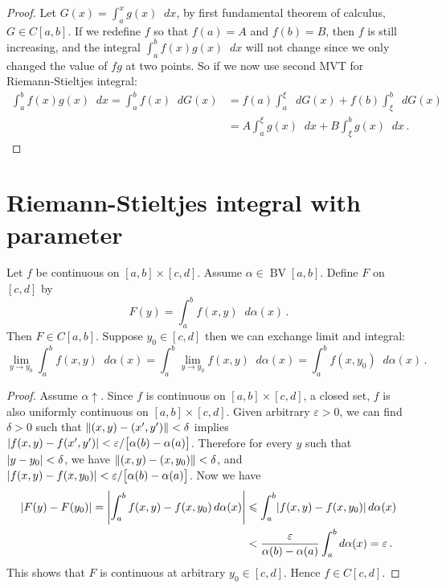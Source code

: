 \documentclass{article}
\DeclarePairedDelimiter\abs{\lvert}{\rvert}
\DeclarePairedDelimiter\norm{\lVert}{\rVert}
\newcommand{\dd}{\mathop{}\!d}
\newcommand{\increasing}{\uparrow}
\DeclareMathOperator{\BV}{BV}
\begin{document}
\begin{proof}
    Let $ G(x) = \int_a^x g(x) \dd x $, by first fundamental theorem of calculus, $ G \in C[a, b] $. If we redefine $ f $ so that $ f(a) = A $ and $ f(b) = B $, then $ f $ is still increasing, and the integral $ \int_a^b f(x) g(x) \dd x $ will not change since we only changed the value of $ f g $ at two points. So if we now use second MVT for Riemann-Stieltjes integral:
    \begin{align*}
        \int_a^b f(x) g(x) \dd x = \int_a^b f(x) \dd G(x) &= f(a) \int_a^\xi \dd G(x) + f(b) \int_\xi^b \dd G(x) \\
        &= A \int_a^\xi g(x) \dd x + B \int_\xi^b g(x) \dd x \,.
    \end{align*}
\end{proof}

\section{Riemann-Stieltjes integral with parameter}
\begin{theorem}
    Let $ f $ be continuous on $ [a, b] \times [c, d] $. Assume $ \alpha \in \BV[a, b] $. Define $ F $ on $ [c, d] $ by
    \[ 
        F(y) = \int_a^b f(x, y) \dd \alpha(x) \,.
    \]
    Then $ F \in C[a, b] $. Suppose $ y_0 \in [c, d] $ then we can exchange limit and integral:
    \[ 
        \lim_{y \to y_0} \int_a^b f(x, y) \dd \alpha(x) = \int_a^b \lim_{y \to y_0} f(x, y) \dd \alpha(x) = \int_a^b f(x, y_0) \dd \alpha(x) \,.
    \]
\end{theorem}

\begin{proof}
    Assume $ \alpha \increasing $. Since $ f $ is continuous on $ [a, b] \times [c, d] $, a closed set, $ f $ is also uniformly continuous on $ [a, b] \times [c, d] $. Given arbitrary $ \varepsilon > 0 $, we can find $ \delta > 0 $ such that $ \norm{(x, y) - (x', y')} < \delta $ implies $ \abs{ f(x, y) - f(x', y') } < \varepsilon / \big[ \alpha(b) - \alpha(a) \big] $. Therefore for every $ y $ such that $ \abs{ y - y_0 } < \delta $, we have $ \norm{(x, y) - (x, y_0)} < \delta $, and $ \abs{ f(x, y) - f(x, y_0) } < \varepsilon / \big[ \alpha(b) - \alpha(a) \big] $. Now we have
    \begin{align*}
        \abs{ F(y) - F(y_0) } = \abs*{ \int_a^b f(x, y) - f(x, y_0) \dd \alpha(x) } &\leqslant \int_a^b \abs{ f(x, y) - f(x, y_0) } \dd \alpha(x) \\
        &< \dfrac{\varepsilon}{\alpha(b) - \alpha(a)} \int_a^b \dd \alpha(x) = \varepsilon \,.
    \end{align*}
    This shows that $ F $ is continuous at arbitrary $ y_0 \in [c, d] $. Hence $ f \in C[c, d] $.
\end{proof}
\end{document}
